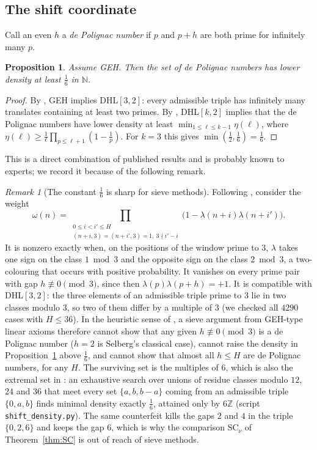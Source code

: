\documentclass[11pt]{amsart}
\newtheorem{proposition}[theorem]{Proposition}
\theoremstyle{definition}
\theoremstyle{remark}
\newtheorem{remark}[theorem]{Remark}
\newcommand{\N}{\mathbb{N}}
\newcommand{\Z}{\mathbb{Z}}
\begin{document}
\subsection{The shift coordinate}\label{sec:shiftcoord}
Call an even $h$ a \emph{de Polignac number} if $p$ and $p+h$ are both prime for infinitely many $p$.

\begin{proposition}\label{prop:S1}
Assume GEH. Then the set of de Polignac numbers has lower density at least $\frac16$ in $\N$.
\end{proposition}
\begin{proof}
By \cite[Thm.~3.2(xii)]{Polymath8b}, GEH implies DHL$[3,2]$: every admissible triple has infinitely many translates containing at least two primes. By \cite[Prop.~2.1]{GKKL15}, DHL$[k,2]$ implies that the de Polignac numbers have lower density at least $\min_{1\le\ell\le k-1}\eta(\ell)$, where $\eta(\ell)\ge\frac1\ell\prod_{p\le\ell+1}(1-\frac1p)$. For $k=3$ this gives $\min(\frac12,\frac16)=\frac16$.
\end{proof}

This is a direct combination of published results and is probably known to experts; we record it because of the following remark.

\begin{remark}[The constant $\frac16$ is sharp for sieve methods]\label{rem:S2}
Following \cite[\S8]{Polymath8b}, consider the weight
\[
\omega(n)=\prod_{\substack{0\le i<i'\le H\\ (n+i,3)=(n+i',3)=1,\ 3\nmid i'-i}}\bigl(1-\lambda(n+i)\lambda(n+i')\bigr).
\]
It is nonzero exactly when, on the positions of the window prime to $3$, $\lambda$ takes one sign on the class $1\bmod3$ and the opposite sign on the class $2\bmod3$, a two-colouring that occurs with positive probability. It vanishes on every prime pair with gap $h\not\equiv0\pmod3$, since then $\lambda(p)\lambda(p+h)=+1$. It is compatible with DHL$[3,2]$: the three elements of an admissible triple prime to $3$ lie in two classes modulo $3$, so two of them differ by a multiple of $3$ (we checked all $4290$ cases with $H\le36$). In the heuristic sense of \cite[\S8]{Polymath8b}, a sieve argument from GEH-type linear axioms therefore cannot show that any given $h\not\equiv0\pmod3$ is a de Polignac number ($h=2$ is Selberg's classical case), cannot raise the density in Proposition~\ref{prop:S1} above $\frac16$, and cannot show that almost all $h\le H$ are de Polignac numbers, for any $H$. The surviving set is the multiples of $6$, which is also the extremal set in \cite{GKKL15}: an exhaustive search over unions of residue classes modulo $12$, $24$ and $36$ that meet every set $\{a,b,b-a\}$ coming from an admissible triple $\{0,a,b\}$ finds minimal density exactly $\frac16$, attained only by $6\Z$ (script \texttt{shift\_density.py}). The same counterfeit kills the gaps $2$ and $4$ in the triple $\{0,2,6\}$ and keeps the gap $6$, which is why the comparison SC$_\nu$ of Theorem~\ref{thm:SC} is out of reach of sieve methods.
\end{remark}
\end{document}
